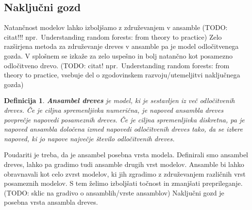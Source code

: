 \documentclass[12pt,a4paper]{article}
\newtheorem{definicija}{Definicija}
\begin{document}
\subsection{Naključni gozd}

Natančnost modelov lahko izboljšamo z združevanjem v ansamble (TODO: citat!!! npr.\ Understanding random forests: from theory to practice)
Zelo razširjena metoda za združevanje dreves v ansamble pa je model odločitvenega gozda. 
V splošnem se izkaže za zelo uspešno in bolj natančno kot posamezno odločitveno drevo. 
(TODO: citat! npr.\ Understanding random forests: from theory to practice, vsebuje del o zgodovinskem razvoju/utemeljitvi naključnega gozda)

\begin{definicija}
\textbf{Ansambel dreves} je model, ki je sestavljen iz več odločitvenih dreves. 
Če je ciljna spremenljivka numerična, je napoved ansambla dreves povprečje napovedi posameznih dreves. 
Če je ciljna spremenljivka diskretna, pa je napoved ansambla določena izmed napovedi odločitvenih dreves tako, da se izbere napoved, ki jo napove največje število odločitvenih dreves.
\end{definicija}

Poudariti je treba, da je ansambel posebna vrsta modela. 
Definirali smo ansambel dreves, lahko pa gradimo tudi ansamble drugih vrst modelov. 
Ansamble bi lahko obravnavali kot celo zvrst modelov, ki jih zgradimo z združevanjem različnih vrst posameznih modelov. 
S tem želimo izboljšati točnost in zmanjšati preprileganje. (TODO: sklic na gradivo o ansamblih/vrste ansamblov) Naključni gozd je posebna vrsta ansambla dreves.
\end{document}
